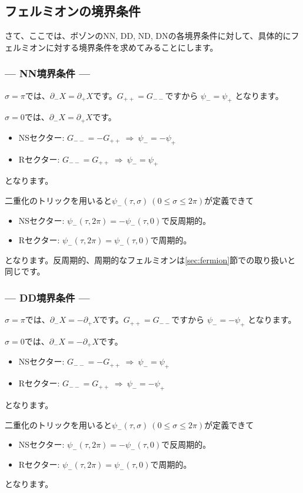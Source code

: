\documentclass[report,paper=a4, fontsize=12pt, line_length=16cm, number_of_lines=34,dvipdfmx]{jlreq}
\numberwithin{equation}{chapter}
\numberwithin{equation}{section}
\newcommand{\del}{\partial}
\begin{document}
\subsection{フェルミオンの境界条件}
さて、ここでは、ボゾンのNN, DD, ND, DNの各境界条件に対して、具体的にフェルミオンに対する境界条件を求めてみることにします。

\subsubsection*{--- NN境界条件 ---}
$\sigma=\pi$では、$\del_{-}X=\del_{+}X$です。$G_{++}=G_{--}$ですから
$\psi_{-}=\psi_{+}$
となります。

$\sigma=0$では、$\del_{-}X=\del_{+}X$です。
\begin{itemize}
  \item NSセクター: $G_{--}=-G_{++}\ \Rightarrow\ 
  \psi_{-}=-\psi_{+}$
  \item Rセクター: $G_{--}=G_{++}\ \Rightarrow\ 
  \psi_{-}=\psi_{+}$
\end{itemize}
となります。

二重化のトリックを用いると$\psi_{-}(\tau,\sigma)\ (0\le \sigma \le 2\pi)$が定義できて
\begin{itemize}
  \item NSセクター: $\psi_{-}(\tau,2\pi)=-\psi_{-}(\tau,0)$で反周期的。
  \item Rセクター: $\psi_{-}(\tau,2\pi)=\psi_{-}(\tau,0)$で周期的。
\end{itemize}
となります。反周期的、周期的なフェルミオンは\ref{sec:fermion}節での取り扱いと同じです。

\subsubsection*{--- DD境界条件 ---}
$\sigma=\pi$では、$\del_{-}X=-\del_{+}X$です。$G_{++}=G_{--}$ですから
$\psi_{-}=-\psi_{+}$
となります。

$\sigma=0$では、$\del_{-}X=-\del_{+}X$です。
\begin{itemize}
  \item NSセクター: $G_{--}=-G_{++}\ \Rightarrow\ 
  \psi_{-}=\psi_{+}$
  \item Rセクター: $G_{--}=G_{++}\ \Rightarrow\ 
  \psi_{-}=-\psi_{+}$
\end{itemize}
となります。

二重化のトリックを用いると$\psi_{-}(\tau,\sigma)\ (0\le \sigma \le 2\pi)$が定義できて
\begin{itemize}
  \item NSセクター: $\psi_{-}(\tau,2\pi)=-\psi_{-}(\tau,0)$で反周期的。
  \item Rセクター: $\psi_{-}(\tau,2\pi)=\psi_{-}(\tau,0)$で周期的。
\end{itemize}
となります。
\end{document}
